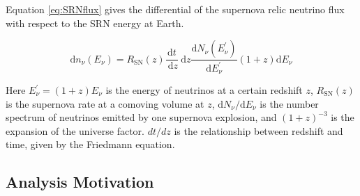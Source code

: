 Equation \ref{eq:SRNflux} gives the differential of the supernova relic neutrino flux with respect to the SRN energy at Earth.

\begin{equation}
\mathrm{d} n_{\nu}\left(E_{\nu}\right)=R_{\mathrm{SN}}(z) \frac{\mathrm{d} t}{\mathrm{~d} z} \mathrm{~d} z \frac{\mathrm{d} N_{\nu}\left(E_{\nu}^{\prime}\right)}{\mathrm{d} E_{\nu}^{\prime}}(1+z) \mathrm{d} E_{\nu}
\label{eq:SRNflux}
\end{equation}

Here $E_{\nu}^{\prime}=(1+z) E_{\nu}$ is the energy of neutrinos at a certain redshift $z$, $R_{\mathrm{SN}}(z)$ is the supernova rate at a comoving volume at $z$, $\mathrm{d} N_{\nu} / \mathrm{d} E_{\nu}$ is the number spectrum of neutrinos emitted by one supernova explosion, and $(1+z)^{-3}$ is the expansion of the universe factor. $dt/dz$ is the relationship between redshift and time, given by the Friedmann equation.








\subsection{Analysis Motivation}




